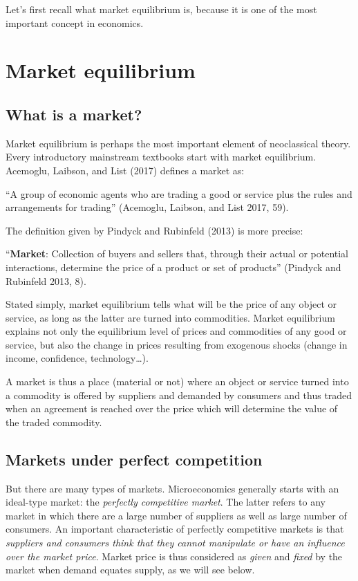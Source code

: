\documentclass[
  letterpaper,
  DIV=11,
  numbers=noendperiod]{scrreprt}
\begin{document}
Let's first recall what market equilibrium is, because it is one of the
most important concept in economics.

\hypertarget{market-equilibrium}{%
\section{Market equilibrium}\label{market-equilibrium}}

\hypertarget{what-is-a-market}{%
\subsection{What is a market?}\label{what-is-a-market}}

Market equilibrium is perhaps the most important element of neoclassical
theory. Every introductory mainstream textbooks start with market
equilibrium. Acemoglu, Laibson, and List (2017) defines a market as:

``A group of economic agents who are trading a good or service plus the
rules and arrangements for trading'' (Acemoglu, Laibson, and List 2017,
59).

The definition given by Pindyck and Rubinfeld (2013) is more precise:

``\textbf{Market}: Collection of buyers and sellers that, through their
actual or potential interactions, determine the price of a product or
set of products'' (Pindyck and Rubinfeld 2013, 8).

Stated simply, market equilibrium tells what will be the price of any
object or service, as long as the latter are turned into commodities.
Market equilibrium explains not only the equilibrium level of prices and
commodities of any good or service, but also the change in prices
resulting from exogenous shocks (change in income, confidence,
technology\ldots).

A market is thus a place (material or not) where an object or service
turned into a commodity is offered by suppliers and demanded by
consumers and thus traded when an agreement is reached over the price
which will determine the value of the traded commodity.

\hypertarget{markets-under-perfect-competition}{%
\subsection{Markets under perfect
competition}\label{markets-under-perfect-competition}}

But there are many types of markets. Microeconomics generally starts
with an ideal-type market: the \emph{perfectly competitive market}. The
latter refers to any market in which there are a large number of
suppliers as well as large number of consumers. An important
characteristic of perfectly competitive markets is that \emph{suppliers
and consumers think that they cannot manipulate or have an influence
over the market price}. Market price is thus considered as \emph{given}
and \emph{fixed} by the market when demand equates supply, as we will
see below.
\end{document}
